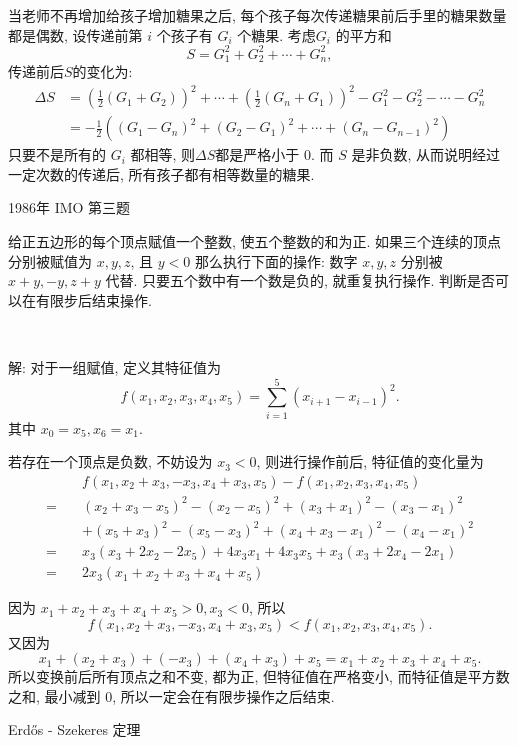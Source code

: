 当老师不再增加给孩子增加糖果之后, 每个孩子每次传递糖果前后手里的糖果数量都是偶数, 设传递前第 $i$ 个孩子有 $G_i$ 个糖果. 考虑$G_i$ 的平方和
\[S = G_1^2 + G_2^2 + \cdots + G_n^2 ,\]
传递前后$S$的变化为:
\begin{align*}
\Delta S &= \left(\frac{1}{2}(G_1+G_2)\right)^2 + \cdots + \left(\frac{1}{2}(G_n+G_1)\right)^2 - G_1^2 - G_2^2 - \cdots - G_n^2 \\
&= -\frac{1}{2}\left((G_1 - G_n)^2 + (G_2-G_1)^2 + \cdots + (G_n - G_{n-1})^2\right)
\end{align*}
只要不是所有的 $G_i$ 都相等, 则$\Delta S$都是严格小于 0. 而 $S$ 是非负数, 从而说明经过一定次数的传递后, 所有孩子都有相等数量的糖果.


\newpage

\noindent 1986年 IMO 第三题

给正五边形的每个顶点赋值一个整数, 使五个整数的和为正. 如果三个连续的顶点分别被赋值为 $x,y,z$, 且 $y < 0$ 那么执行下面的操作: 数字 $x,y,z$ 分别被 $x+y,-y,z+y$ 代替. 只要五个数中有一个数是负的, 就重复执行操作. 判断是否可以在有限步后结束操作.

~

解: 对于一组赋值, 定义其特征值为
\[f(x_1,x_2,x_3,x_4,x_5) = \sum_{i=1}^5{(x_{i+1}-x_{i-1})^2}. \]
其中 $x_0=x_5, x_6=x_1$.

若存在一个顶点是负数, 不妨设为 $x_3 < 0$, 则进行操作前后, 特征值的变化量为
\begin{align*}
& f(x_1,x_2+x_3,-x_3,x_4+x_3,x_5) - f(x_1,x_2,x_3,x_4,x_5) \\
= \quad & (x_2+x_3-x_5)^2 - (x_2-x_5)^2 + (x_3+x_1)^2-(x_3-x_1)^2 \\
& + (x_5+x_3)^2-(x_5-x_3)^2 + (x_4+x_3-x_1)^2-(x_4-x_1)^2 \\
= \quad & x_3(x_3+2x_2-2x_5) + 4x_3x_1 + 4x_3x_5 + x_3(x_3+2x_4-2x_1) \\
= \quad & 2x_3(x_1+x_2+x_3+x_4+x_5)
\end{align*}

因为 $x_1+x_2+x_3+x_4+x_5 > 0, x_3<0$, 所以 
\[f(x_1,x_2+x_3,-x_3,x_4+x_3,x_5) < f(x_1,x_2,x_3,x_4,x_5) .\]
又因为
\[x_1 + (x_2+x_3) + (-x_3) + (x_4+x_3) + x_5 = x_1+x_2+x_3+x_4+x_5 .\]
所以变换前后所有顶点之和不变, 都为正, 但特征值在严格变小, 而特征值是平方数之和, 最小减到 $0$, 所以一定会在有限步操作之后结束.

\newpage
\noindent Erd\H{o}s - Szekeres 定理

